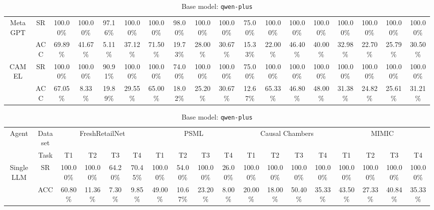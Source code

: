 \begin{table}[t]
\begin{subtable}[t]{\textwidth}
\begin{tabular}{c|c|cccc|cccc|cccc|cccc}
\multirow{2}{*}{MetaGPT}
& SR
& 100.00\% & 100.00\% & 97.16\% & \multicolumn{1}{c|}{100.00\%}
& 100.00\% & 98.00\% & 100.00\% & \multicolumn{1}{c|}{100.00\%}
& 75.00\% & 100.00\% & 100.00\% & \multicolumn{1}{c|}{100.00\%}
& 100.00\% & 100.00\% & 100.00\% & 100.00\% \\
& ACC
& 69.89\% & 41.67\% & 5.11\% & \multicolumn{1}{c|}{37.12\%}
& 71.50\% & 19.73\% & 28.00\% & \multicolumn{1}{c|}{30.67\%}
& 15.33\% & 22.00\% & 46.40\% & \multicolumn{1}{c|}{40.00\%}
& 32.98\% & 22.70\% & 25.79\% & 30.50\% \\
\midrule

\multirow{2}{*}{CAMEL}
& SR
& 100.00\% & 100.00\% & 90.91\% & \multicolumn{1}{c|}{100.00\%}
& 100.00\% & 74.00\% & 100.00\% & \multicolumn{1}{c|}{100.00\%}
& 75.00\% & 100.00\% & 100.00\% & \multicolumn{1}{c|}{100.00\%}
& 100.00\% & 100.00\% & 100.00\% & 100.00\% \\
& ACC
& 67.05\% & 8.33\% & 19.89\% & \multicolumn{1}{c|}{29.55\%}
& 65.00\% & 18.02\% & 25.20\% & \multicolumn{1}{c|}{30.67\%}
& 12.67\% & 65.33\% & 46.80\% & \multicolumn{1}{c|}{48.00\%}
& 31.38\% & 24.82\% & 25.61\% & 31.21\% \\
\bottomrule
\end{tabular}
\end{subtable}

\vspace{2pt}

\begin{subtable}[t]{\textwidth}
\centering
\caption{Base model: \texttt{qwen-plus}}
\setlength{\tabcolsep}{2.8pt}
\renewcommand{\arraystretch}{1.2}

\begin{tabular}{c|c|cccc|cccc|cccc|cccc}
\toprule
\multirow{2}{*}{Agent} & Dataset
& \multicolumn{4}{c|}{FreshRetailNet}
& \multicolumn{4}{c|}{PSML}
& \multicolumn{4}{c|}{Causal Chambers}
& \multicolumn{4}{c}{MIMIC} \\
\cmidrule(lr){3-6}
\cmidrule(lr){7-10}
\cmidrule(lr){11-14}
\cmidrule(lr){15-18}

& Task
& T1 & T2 & T3 & \multicolumn{1}{c|}{T4}
& T1 & T2 & T3 & \multicolumn{1}{c|}{T4}
& T1 & T2 & T3 & \multicolumn{1}{c|}{T4}
& T1 & T2 & T3 & T4 \\
\midrule

\multirow{2}{*}{Single LLM}
& SR
& 100.00\% & 100.00\% & 64.20\% & \multicolumn{1}{c|}{70.45\%}
& 100.00\% & 54.00\% & 100.00\% & \multicolumn{1}{c|}{26.00\%}
& 100.00\% & 100.00\% & 100.00\% & \multicolumn{1}{c|}{100.00\%}
& 100.00\% & 100.00\% & 100.00\% & 100.00\% \\
& ACC
& 60.80\% & 11.36\% & 7.30\% & \multicolumn{1}{c|}{9.85\%}
& 49.00\% & 10.67\% & 23.20\% & \multicolumn{1}{c|}{8.00\%}
& 20.00\% & 18.00\% & 50.40\% & \multicolumn{1}{c|}{35.33\%}
& 43.50\% & 27.33\% & 40.84\% & 35.33\% \\
\midrule


\end{tabular}
\end{subtable}
\end{table}

